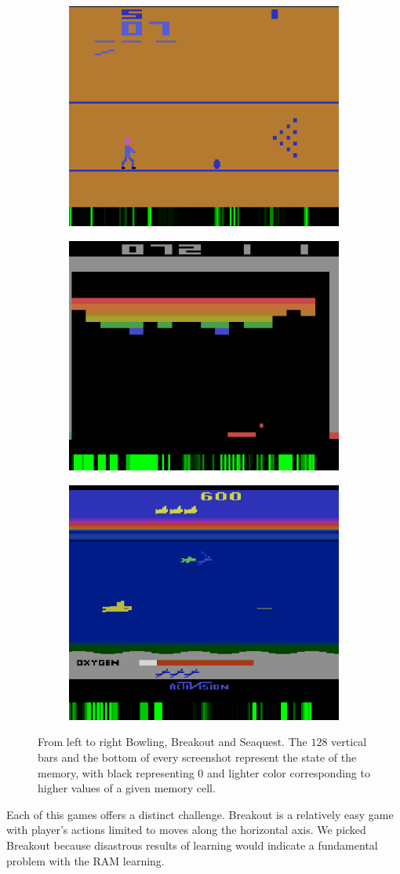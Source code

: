 \begin{figure}
\begin{center}
\begin{subfigure}
  \centering
  \includegraphics[width=.325\linewidth]{images/bowling1.png}
  \label{fig:sub1}
\end{subfigure}
\begin{subfigure}
  \centering
   \includegraphics[width=.31\linewidth]{images/breakout2.png}
  \label{fig:sub2}
\end{subfigure}%
\begin{subfigure}
  \centering
  \includegraphics[width=.30\linewidth]{images/seaquest2.png}
  \label{fig:sub3}
\end{subfigure}
\caption{From left to right Bowling, Breakout and Seaquest. The $128$ vertical bars and the bottom of every screenshot represent the state of the memory, with black representing $0$ and lighter color corresponding to higher values of a given memory cell. }
\end{center}
\label{fig:screenshots}
\end{figure}

Each of this games offers a distinct challenge. Breakout is a relatively easy game with player's actions limited to moves along the horizontal axis. We picked Breakout because disastrous results of learning would indicate a fundamental problem with the RAM learning.

